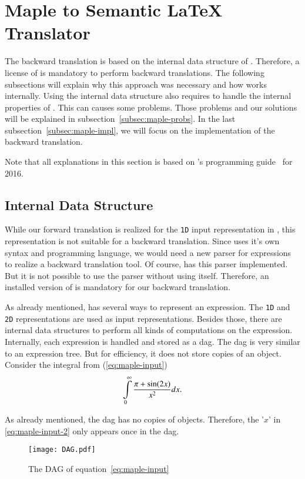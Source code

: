 \section{Maple to Semantic \LaTeX{} Translator}\label{sec:backward-translation}
The backward translation is based on the internal data structure of \Maple. Therefore, a license of \Maple{} is mandatory to perform backward translations. The following subsections will explain why this approach was necessary and how \Maple{} works internally. Using the internal data structure also requires to handle the internal properties of \Maple. This can causes some problems. Those problems and our solutions will be explained in subsection~\ref{subsec:maple-probs}. In the last subsection~\ref{subsec:maple-impl}, we will focus on the implementation of the backward translation.

Note that all explanations in this section is based on \Maple's programming guide~\parencite{MAPLE:ProgrammingGuide} for \Maple{} 2016. 

\subsection{Internal Data Structure}
While our forward translation is realized for the \texttt{1D} input representation in \Maple, this representation is not suitable for a backward translation. Since \Maple{} uses it's own syntax and programming language, we would need a new parser for \Maple{} expressions to realize a backward translation tool. Of course, \Maple{} has this parser implemented. But it is not possible to use the parser without using \Maple{} itself. Therefore, an installed version of \Maple{} is mandatory for our backward translation.  

As already mentioned, \Maple{} has several ways to represent an expression. The \texttt{1D} and \texttt{2D} representations are used as input representations. Besides those, there are internal data structures to perform all kinds of computations on the expression. Internally, each expression is handled and stored as a \gls{dag}. The \Maple{} \gls{dag} is very similar to an expression tree. But for efficiency, it does not store copies of an object. Consider the integral from (\ref{eq:maple-input})
\begin{equation}\label{eq:maple-input-2}
\int\displaylimits_0^\infty \frac{\pi+\sin(2x)}{x^2} dx.
\end{equation}

As already mentioned, the \Maple{} \gls{dag} has no copies of objects. Therefore, the '$x$' in \eqref{eq:maple-input-2} only appears once in the \gls{dag}.
\begin{figure}[ht]
\centering
\texttt{[image: DAG.pdf]}
\caption{The \Maple{} DAG of equation~\eqref{eq:maple-input}}
\label{fig:maple-dag}
\end{figure}

